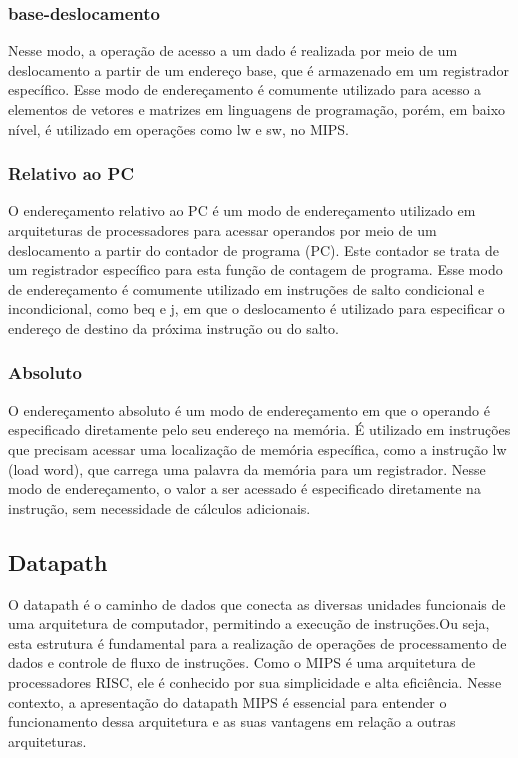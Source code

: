 \documentclass[
	12pt,				%
	openright,			%
	a4paper,			%
	english,			%
	french,				%
	spanish,			%
	brazil,				%
	]{abntex2}
\begin{document}
\subsubsection{base-deslocamento}
Nesse modo, a operação de acesso a um dado é realizada por meio de um deslocamento a partir de um endereço base, que é armazenado em um registrador específico. Esse modo de endereçamento é comumente utilizado para acesso a elementos de vetores e matrizes em linguagens de programação, porém, em baixo nível, é utilizado em operações como lw e sw, no MIPS.

\subsubsection{Relativo ao PC}
O endereçamento relativo ao PC é um modo de endereçamento utilizado em arquiteturas de processadores para acessar operandos por meio de um deslocamento a partir do contador de programa (PC). Este contador se trata de um registrador específico para esta função de contagem de programa. Esse modo de endereçamento é comumente utilizado em instruções de salto condicional e incondicional, como beq e j, em que o deslocamento é utilizado para especificar o endereço de destino da próxima instrução ou do salto.

\subsubsection{Absoluto}
O endereçamento absoluto é um modo de endereçamento em que o operando é especificado diretamente pelo seu endereço na memória. É utilizado em instruções que precisam acessar uma localização de memória específica, como a instrução lw (load word), que carrega uma palavra da memória para um registrador. Nesse modo de endereçamento, o valor a ser acessado é especificado diretamente na instrução, sem necessidade de cálculos adicionais.

\subsection{Datapath}
O datapath é o caminho de dados que conecta as diversas unidades funcionais de uma arquitetura de computador, permitindo a execução de instruções.Ou seja, esta estrutura é fundamental para a realização de operações de processamento de dados e controle de fluxo de instruções. Como o MIPS é uma arquitetura de processadores RISC, ele é conhecido por sua simplicidade e alta eficiência. Nesse contexto, a apresentação do datapath MIPS é essencial para entender o funcionamento dessa arquitetura e as suas vantagens em relação a outras arquiteturas.
\end{document}
